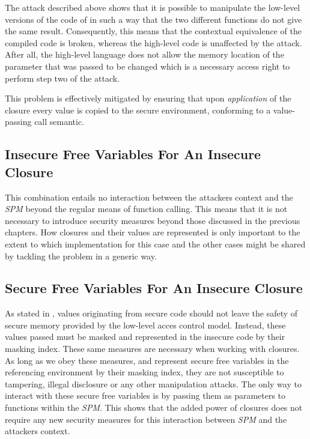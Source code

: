 \documentclass[10pt,a4paper,master=cws, masteroption=ai,english,inputenc=utf8]{kulemt}
\begin{document}
The attack described above shows that it is possible to manipulate the low-level versions of the code of  in such a way that the two different functions do not give the same result. 
Consequently, this means that the contextual equivalence of the compiled code is broken, whereas the high-level code is unaffected by the attack.
After all, the high-level language does not allow the memory location of the parameter that was passed to be changed which is a necessary access right to perform step two of the attack.

This problem is effectively mitigated by ensuring that upon \emph{application} of the closure every value is copied to the secure environment, conforming to a value-passing call semantic.



\subsection{Insecure Free Variables For An Insecure Closure}

This combination entails no interaction between the attackers context and the \emph{SPM} beyond the regular means of function calling.
This means that it is not necessary to introduce security measures beyond those discussed in the previous chapters.
How closures and their values are represented is only important to the extent to which implementation for this case and the other cases might be shared by tackling the problem in a generic way.

\subsection{Secure Free Variables For An Insecure Closure}

As stated in , values originating from secure code should not leave the safety of secure memory provided by the low-level acces control model.
Instead, these values passed must be masked and represented in the insecure code by their masking index.
These same measures are necessary when working with closures.
As long as we obey these measures, and represent secure free variables in the referencing environment by their masking index, they are not susceptible to tampering, illegal disclosure or any other manipulation attacks.
The only way to interact with these secure free variables is by passing them as parameters to functions within the \emph{SPM}.
This shows that the added power of closures does not require any new security measures for this interaction between \emph{SPM} and the attackers context.
\end{document}
